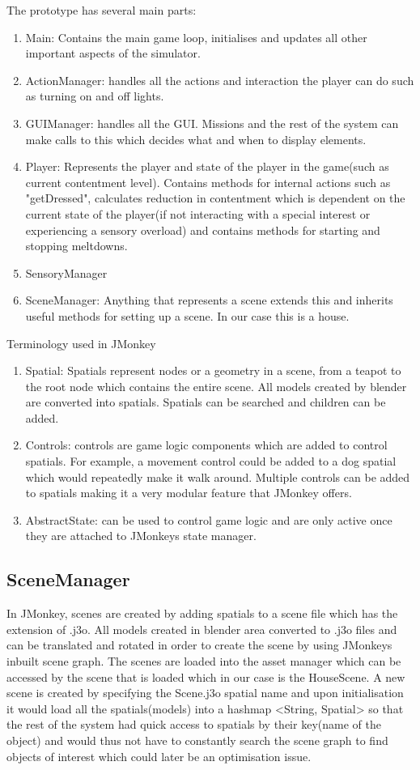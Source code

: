 The prototype has several main parts:
\begin{enumerate}
\item Main: Contains the main game loop, initialises and updates all other important aspects of the simulator.
\item ActionManager: handles all the actions and interaction the player can do such as turning on and off lights.
\item GUIManager: handles all the GUI. Missions and the rest of the system can make calls to this which decides what and when to display elements. 
\item Player: Represents the player and state of the player in the game(such as current contentment level). Contains methods for internal actions such as "getDressed", calculates reduction in contentment which is dependent on the current state of the player(if not interacting with a special interest or experiencing a sensory overload) and contains methods for starting and stopping meltdowns.
\item SensoryManager
\item SceneManager: Anything that represents a scene extends this and inherits useful methods for setting up a scene. In our case this is a house. 
\end{enumerate}

Terminology used in JMonkey
\begin{enumerate}
\item Spatial: Spatials represent nodes or a geometry in a scene, from a teapot to the root node which contains the entire scene. All models created by blender are converted into spatials. Spatials can be searched and children can be added.
\item Controls: controls are game logic components which are added to control spatials. For example, a movement control could be added to a dog spatial which would repeatedly make it walk around. Multiple controls can be added to spatials making it a very modular feature that JMonkey offers. 
\item AbstractState: can be used to control game logic and are only active once they are attached to JMonkeys state manager.
\end{enumerate}

\subsection{SceneManager}
In JMonkey, scenes are created by adding spatials to a scene file which has the extension of .j3o. All models created in blender area converted to .j3o files and can be translated and rotated in order to create the scene by using JMonkeys inbuilt scene graph. The scenes are loaded into the asset manager which can be accessed by the scene that is loaded which in our case is the HouseScene. A new scene is created by specifying the Scene.j3o spatial name and upon initialisation it would load all the spatials(models) into a hashmap <String, Spatial> so that the rest of the system had quick access to spatials by their key(name of the object) and would thus not have to constantly search the scene graph to find objects of interest which could later be an optimisation issue. 

